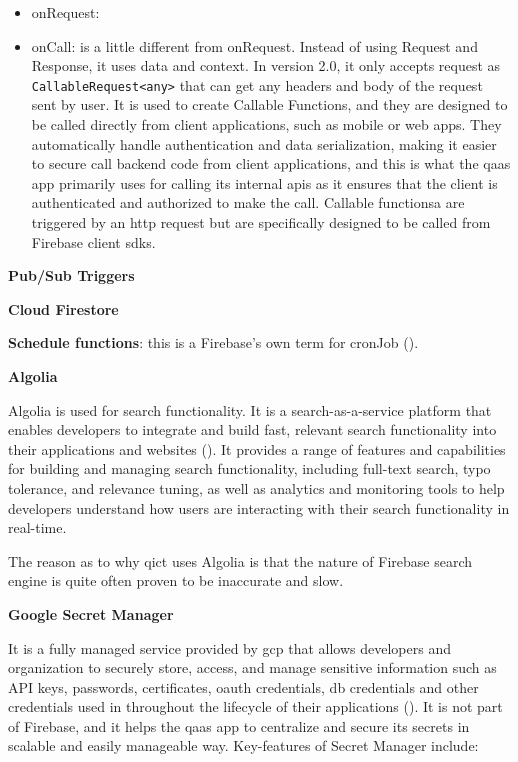 \begin{multicols}{2}
      \begin{itemize}
            \item onRequest:
            \item onCall: is a little different from onRequest. Instead of using Request and Response, it uses data and context.
                  In version 2.0, it only accepts request as \texttt{CallableRequest<any>} that can get any headers and body
                  of the request sent by user. It is used to create Callable Functions, and they are designed to be called directly
                  from client applications, such as mobile or web apps. They automatically handle authentication and data serialization,
                  making it easier to secure call backend code from client applications, and this is what the \acrshort{qaas} app
                  primarily uses for calling its internal \acrshort{api}s as it ensures that the client is authenticated and authorized
                  to make the call. Callable functionsa are triggered by an \acrshort{http} request but are specifically designed to be
                  called from Firebase client \acrshort{sdk}s.

      \end{itemize}

      \textbf{Pub/Sub Triggers}

      \textbf{Cloud Firestore}

      \textbf{Schedule functions}: this is a Firebase's own term for \gls{cronJob} (\textit{\cite{scheduleFunction}}).

      \textbf{Algolia}

      Algolia is used for search functionality. It is a search-as-a-service platform that enables developers to
      integrate and build fast, relevant search functionality into their applications and websites
      (\textit{\cite{algolia}}). It provides a range of features and capabilities for building and managing search
      functionality, including full-text search, typo tolerance, and relevance tuning, as well as analytics and
      monitoring tools to help developers understand how users are interacting with their search functionality in
      real-time.

      The reason as to why \acrshort{qict} uses Algolia is that the nature of Firebase search engine is quite often
      proven to be inaccurate and slow.

      \textbf{Google Secret Manager}

      It is a fully managed service provided by \acrshort{gcp} that allows developers and organization to securely store,
      access, and manage sensitive information such as API keys, passwords, certificates, \acrshort{oauth} credentials,
      \acrshort{db} credentials and other credentials used in throughout the lifecycle of their applications
      (\textit{\cite{googlesecretmanager}}). It is not part of Firebase, and it helps the \acrshort{qaas} app to centralize and
      secure its secrets in scalable and easily manageable way. Key-features of Secret Manager include:


\end{multicols}
